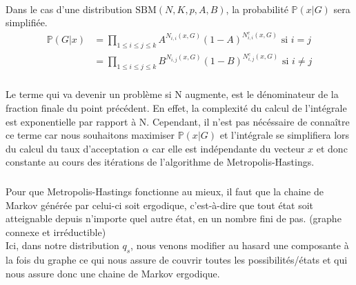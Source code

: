 \paragraph*{}
Dans le cas d'une distribution $\text{SBM}(N,K,p,A,B)$, la probabilité $\mathbb{P}(x|G)$ sera simplifiée.
\begin{align*}
    \mathbb{P}(G|x) &= \prod_{1 \leq i \leq j \leq k} A^{N_{i,i}(x,G)} (1-A)^{N_{i,i}^c(x,G)}\text{ si }i=j\\
                    &= \prod_{1 \leq i \leq j \leq k} B^{N_{i,j}(x,G)} (1-B)^{N_{i,j}^c(x,G)}\text{ si }i \ne j
\end{align*}
\subsubsection{}
\paragraph*{}
Le terme qui va devenir un problème si N augmente, est le dénominateur de la fraction finale du point précédent. En effet, la complexité du calcul de l'intégrale
est exponentielle par rapport à N. Cependant, il n'est pas nécéssaire de connaître ce terme car nous souhaitons maximiser $\mathbb{P}(x|G)$ et l'intégrale se 
simplifiera lors du calcul du taux d'acceptation $\alpha$ car elle est indépendante du vecteur $x$ et donc constante au cours des itérations de l'algorithme de 
Metropolis-Hastings.
\subsubsection{}
Pour que Metropolis-Hastings fonctionne au mieux, il faut que la chaine de Markov générée par celui-ci soit ergodique, c'est-à-dire que tout état soit atteignable depuis n'importe quel autre état,
en un nombre fini de pas. (graphe connexe et irréductible) \\
Ici, dans notre distribution $q_{s}$, nous venons modifier au hasard une composante à la fois du graphe ce qui nous assure de couvrir toutes les possibilités/états et qui nous assure donc une chaine de Markov ergodique.

